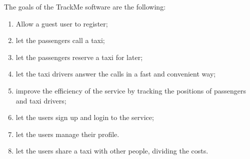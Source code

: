 The goals of the TrackMe software are the following:
\begin{enumerate}
	\item Allow a guest user to register; \label{g-simplify}
	\item let the passengers call a taxi;  \label{g-taxicall}
	\item let the passengers reserve a taxi for later;  \label{g-reserve}
	\item let the taxi drivers answer the calls in a fast and convenient way;  \label{g-notify}
	\item improve the efficiency of the service by tracking the positions of passengers and taxi drivers;  \label{g-position}
	\item let the users sign up and login to the service;  \label{g-login}
	\item let the users manage their profile. \label{g-profile}
	\item let the users share a taxi with other people, dividing the costs. \label{g-share}
\end{enumerate}